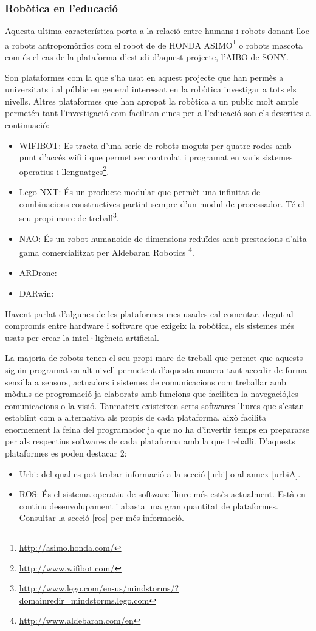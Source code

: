 \documentclass[12pt,a4paper,final,twoside]{article}
\begin{document}
\subsubsection{Robòtica en l'educació}
Aquesta ultima característica porta a la relació entre humans i robots donant lloc a robots antropomòrfics com el robot de de HONDA ASIMO\footnote{\url{http://asimo.honda.com/}} o robots mascota com és el cas de la plataforma d'estudi d'aquest projecte, l'AIBO de SONY.

Son plataformes com la que s'ha usat en aquest projecte que han permès a universitats i al públic en general interessat en la robòtica investigar a tots els nivells. Altres plataformes que han apropat la robòtica a un public molt ample permetén tant l'investigació com facilitan eines per a l'educació son els descrites a continuació:

\begin{itemize}
\item WIFIBOT: Es tracta d'una serie de robots moguts per quatre rodes amb punt d'accés wifi i que permet ser controlat i programat en varis sistemes operatius i llenguatges\footnote{\url{http://www.wifibot.com/}}.
\item Lego NXT: És un producte modular que permèt una infinitat de combinacions constructives partint sempre d'un modul de processador. Té el seu propi marc de treball\footnote{\url{http://www.lego.com/en-us/mindstorms/?domainredir=mindstorms.lego.com}}.
\item NAO: És un robot humanoide de dimensions reduïdes amb prestacions d'alta gama comercialitzat per Aldebaran Robotics \footnote{\url{http://www.aldebaran.com/en}}.
\item ARDrone:
\item DARwin:


\end{itemize}

Havent parlat d'algunes de les plataformes mes usades cal comentar, degut al compromís entre hardware i software que exigeix la robòtica, els sistemes més usats per crear la intel·ligència artificial.

La majoria de robots tenen el seu propi marc de treball que permet que aquests siguin programat en alt nivell permetent d'aquesta manera tant accedir de forma senzilla a sensors, actuadors i sistemes de comunicacions com treballar amb mòduls de programació ja elaborats amb funcions que faciliten la navegació,les comunicacions o la visió.
Tanmateix existeixen serts softwares lliures que s'estan establint com a alternativa als propis de cada plataforma. això facilita enormement la feina del programador ja que no ha d'invertir temps en prepararse per als respectius softwares de cada plataforma amb la que treballi.
D'aquests plataformes es poden destacar 2:
\begin{itemize}
\item Urbi: del qual es pot trobar informació a la secció \ref{urbi} o al annex \ref{urbiA}.
\item ROS: És el sistema operatiu de software lliure més estès actualment. Està en continu desenvolupament i abasta una gran quantitat de plataformes. Consultar la secció \ref{ros} per més informació.
\end{itemize} 
\end{document}
